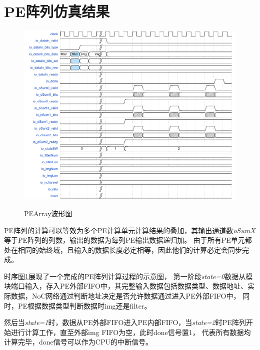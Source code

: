 \section{PE阵列仿真结果}
\begin{figure}[h]
    \centering
    \includegraphics[scale=0.65]{../pdf/pearray_w.pdf}\\
    \caption{PEArray波形图}
    \label{pearray_w}
\end{figure}
PE阵列的计算可以等效为多个PE计算单元计算结果的叠加，其输出通道数\emph{oSumX}等于PE阵列的列数，输出的数据为每列PE输出数据递归加。
由于所有PE单元都处在相同的始终域，且输入的数据长度必定相等，因此他们的计算必定会同步完成。

时序图\ref{pearray_w}展现了一个完成的PE阵列计算过程的示意图，
第一阶段\emph{state=0}数据从模块端口输入，存入PE外部FIFO中，其完整输入数据包括数据类型、数据地址、实际数据，NoC网络通过判断地址决定是否允许数据通过进入PE外部FIFO中，
同时，PE根据数据类型判断数据时img还是filter。

然后当\emph{state=1}时，数据从PE外部FIFO进入PE内部FIFO，当\emph{state=2}时PE阵列开始进行计算工作，直至外部img FIFO为空，此时done信号置1，
代表所有数据均计算完毕，done信号可以作为CPU的中断信号。


